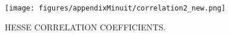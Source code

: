 %

 \begin{figure}[!ht]
\begin{center}

    \texttt{[image: figures/appendixMinuit/correlation2\_new.png]}

  \caption{HESSE CORRELATION COEFFICIENTS.}

  \label{correlationMatrix}
\end{center}
\end{figure}

